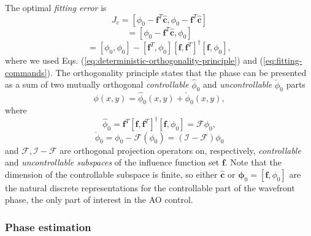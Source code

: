 The optimal \emph{fitting error} is 
\begin{equation} \label{eq:fitting-error}
	J_{c} = [\phi_{0} - \bm{f}^{T} \hat{\bm{c}},\phi_{0} -
	         \bm{f}^{T} \hat{\bm{c}}]
\end{equation}
$$
  = [\phi_{0} - \bm{f}^{T} \hat{\bm{c}},\phi_{0}]
$$
$$
  = [\phi_{0},\phi_{0}] -
    [\bm{f}^{T},\phi_{0}] [\bm{f},\bm{f}^{T}]^{\dagger} [\bm{f},\phi_{0}],
$$
where we used Eqs. (\ref{eq:deterministic-orthogonality-principle}) and
(\ref{eq:fitting-commands}). The orthogonality principle states that the phase
can be presented as a sum of two mutually orthogonal \emph{controllable}
$\hat{\phi}_{0}$ and
\emph{uncontrollable} $\check{\phi}_{0}$ parts 
\begin{equation} \label{eq:controllable-uncontrollable}
	\phi (x,y) = \hat{\phi}_{0} (x,y) + \check{\phi}_{0} (x,y),
\end{equation}
where
\begin{equation} \label{eq:controllable-projection}
	\hat{\phi}_{0} = \bm{f}^{T} [\bm{f},\bm{f}^{T}]^{\dagger} [\bm{f},\phi_{0}] =
	\mathcal{F} \phi_{0},
\end{equation}
\begin{equation} \label{eq:uncontrollable-projection}
	\check{\phi}_{0} = \phi_{0} - \mathcal{F} (\phi_{0}) =
	(\mathcal{I - F})\phi_{0}
\end{equation}
and $\mathcal{F},\mathcal{I - F}$ are orthogonal projection operators on,
respectively, \emph{controllable} and \emph{uncontrollable subspaces} of the
influence function set $\bm{f}$. 
 Note that the dimension of the controllable
subspace is finite, so either $\hat{\bm{c}}$ or $\bm{\phi}_{0} =
[\bm{f},\phi_{0}]$
are the natural discrete representations for the controllable part of the
wavefront phase, the only part of interest in the AO control.

\subsubsection{Phase estimation}

